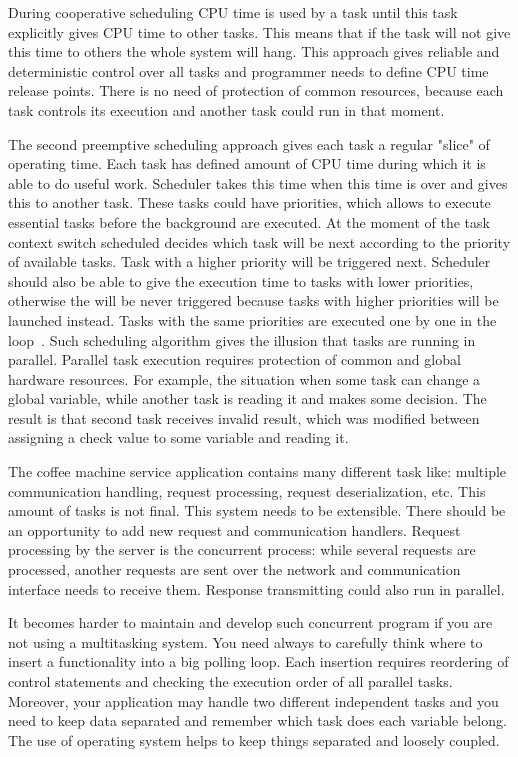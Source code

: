 During cooperative scheduling CPU time is used by a task until this task explicitly gives CPU time to other tasks.
This means that if the task will not give this time to others the whole system will hang.
This approach gives reliable and deterministic control over all tasks  and programmer needs to define CPU time release points.
There is no need of protection of common resources, because each task controls its execution and another task could run in that moment.

The second preemptive scheduling approach gives each task a regular "slice" of operating time. 
Each task has defined amount of CPU time during which it is able to do useful work.
Scheduler takes this time when this time is over and gives this to another task.
These tasks could have priorities, which allows to execute essential tasks before the background are executed.
At the moment of the task context switch scheduled decides which task will be next according to the priority of available tasks.
Task with a higher priority will be triggered next. 
Scheduler should also be able to give the execution time to tasks with lower priorities, otherwise the will be never triggered because tasks with higher priorities will be launched instead.
Tasks with the same priorities are executed one by one in the loop~\cite{barry2010using}.
Such scheduling algorithm gives the illusion that tasks are running in parallel.
Parallel task execution requires protection of common and global hardware resources. 
For example, the situation when some task can change a global variable, while another task is reading it and makes some decision.
The result is that second task receives invalid result, which was modified between assigning a check value to some variable and reading it.


The coffee machine service application contains many different task like: 
multiple communication handling,
request processing,
request deserialization, etc.
This amount of tasks is not final.
This system needs to be extensible.
There should be an opportunity to add new request and communication handlers.
Request processing by the server is the concurrent process: while several requests are processed, another requests are sent over the network and communication interface needs to receive them.
Response transmitting could also run in parallel.

It becomes harder to maintain and develop such concurrent program if you are not using a multitasking system. 
You need always to carefully think where to insert a functionality into a big polling loop.
Each insertion requires reordering of control statements and checking the execution order of all parallel tasks.
Moreover, your application may handle two different independent tasks and you need to keep data separated and remember which task does each variable belong.
The use of operating system helps to keep things separated and loosely coupled.
 
